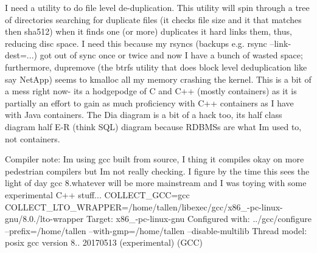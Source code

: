 I need a utility to do file level de-\/duplication. This utility will spin through a tree of directories searching for duplicate files (it checks file size and it that matches then sha512) when it finds one (or more) duplicates it hard links them, thus, reducing disc space. I need this because my rsyncs (backups e.\+g. rsync --link-\/dest=...) got out of sync once or twice and now I have a bunch of wasted space; furthermore, dupremove (the btrfs utility that does block level deduplication like say Net\+App) seems to kmalloc all my memory crashing the kernel. This is a bit of a mess right now-\/ it\textquotesingle{}s a hodgepodge of C and C++ (mostly containers) as it is partially an effort to gain as much proficiency with C++ containers as I have with Java containers. The Dia diagram is a bit of a hack too, it\textquotesingle{}s half class diagram half E-\/R (think S\+QL) diagram because R\+D\+B\+M\+Ss are what I\textquotesingle{}m used to, not containers.

Compiler note\+: I\textquotesingle{}m using gcc built from source, I thing it compiles okay on more pedestrian compilers but I\textquotesingle{}m not really checking. I figure by the time this sees the light of day gcc 8.\+whatever will be more mainstream and I was toying with some experimental C++ stuff... C\+O\+L\+L\+E\+C\+T\+\_\+\+G\+CC=gcc C\+O\+L\+L\+E\+C\+T\+\_\+\+L\+T\+O\+\_\+\+W\+R\+A\+P\+P\+ER=/home/tallen/libexec/gcc/x86\+\_-\/pc-\/linux-\/gnu/8.0./lto-\/wrapper Target\+: x86\+\_-\/pc-\/linux-\/gnu Configured with\+: ../gcc/configure --prefix=/home/tallen --with-\/gmp=/home/tallen --disable-\/multilib Thread model\+: posix gcc version 8.. 20170513 (experimental) (G\+CC) 
